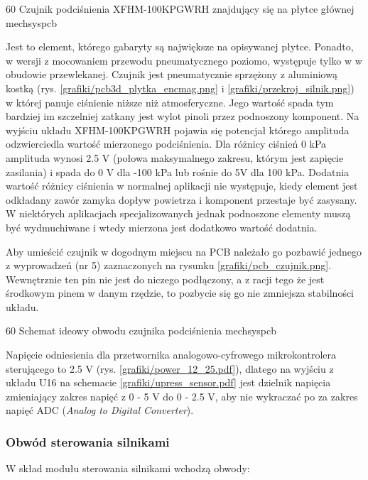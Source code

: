 	{60}
	{Czujnik podciśnienia XFHM-100KPGWRH znajdujący się na płytce głównej}
	{mechsyspcb}

Jest to element, którego gabaryty są największe na opisywanej płytce. Ponadto, w wersji z mocowaniem przewodu pneumatycznego poziomo, występuje tylko w w obudowie przewlekanej. Czujnik jest pneumatycznie sprzężony z aluminiową kostką (rys. \ref{grafiki/pcb3d_plytka_encmag.png} i \ref{grafiki/przekroj_silnik.png}) w której panuje ciśnienie niższe niż atmosferyczne. Jego wartość spada tym bardziej im szczelniej zatkany jest wylot pinoli przez podnoszony komponent. Na wyjściu układu XFHM-100KPGWRH pojawia się potencjał którego amplituda odzwierciedla wartość mierzonego podciśnienia. Dla różnicy ciśnień 0 kPa amplituda wynosi 2.5 V (połowa maksymalnego zakresu, którym jest zapięcie zasilania) i spada do 0 V dla -100 kPa lub rośnie do 5V dla 100 kPa. Dodatnia wartość różnicy ciśnienia w normalnej aplikacji nie występuje, kiedy element jest odkładany zawór zamyka dopływ powietrza i komponent przestaje być zasysany. W niektórych aplikacjach specjalizowanych jednak podnoszone elementy muszą być wydmuchiwane i wtedy mierzona jest dodatkowo wartość dodatnia.

Aby umieścić czujnik w dogodnym miejscu na PCB należało go pozbawić jednego z wyprowadzeń (nr 5) zaznaczonych na rysunku \ref{grafiki/pcb_czujnik.png}. Wewnętrznie ten pin nie jest do niczego podłączony, a z racji tego że jest środkowym pinem w danym rzędzie, to pozbycie się go nie zmniejsza stabilności układu.

	{60}
	{Schemat ideowy obwodu czujnika podciśnienia}
	{mechsyspcb}

Napięcie odniesienia dla przetwornika analogowo-cyfrowego mikrokontrolera sterującego to 2.5 V (rys. \ref{grafiki/power_12_25.pdf}), dlatego na wyjściu z układu U16 na schemacie \ref{grafiki/upress_sensor.pdf} jest dzielnik napięcia zmieniający zakres napięć z 0 - 5 V do 0 - 2.5 V, aby nie wykraczać po za zakres napięć ADC ({\it Analog to Digital Converter}).

\subsubsection{Obwód sterowania silnikami}
\label{sss:sterowanie_silnikami}

W skład modułu sterowania silnikami wchodzą obwody: \\

